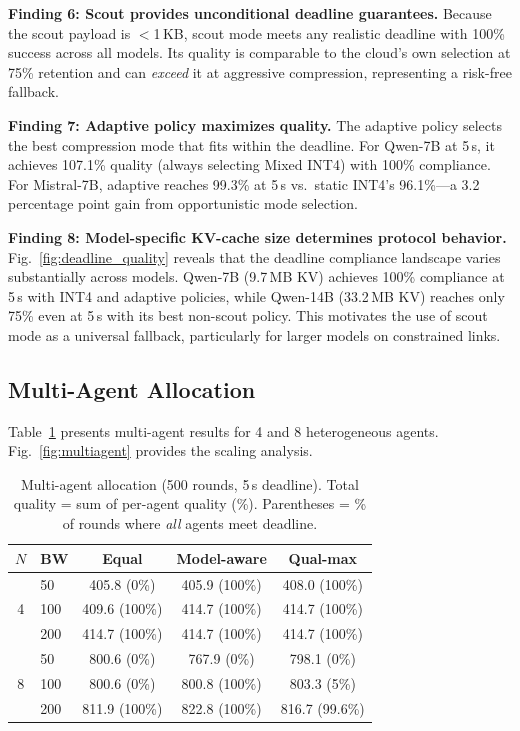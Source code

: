 \documentclass[conference]{IEEEtran}
\begin{document}
\textbf{Finding 6: Scout provides unconditional deadline guarantees.}
Because the scout payload is $<$1\,KB, scout mode meets any realistic deadline with 100\% success across all models.
Its quality is comparable to the cloud's own selection at 75\% retention and can \emph{exceed} it at aggressive compression, representing a risk-free fallback.

\textbf{Finding 7: Adaptive policy maximizes quality.}
The adaptive policy selects the best compression mode that fits within the deadline.
For Qwen-7B at 5\,s, it achieves 107.1\% quality (always selecting Mixed INT4) with 100\% compliance.
For Mistral-7B, adaptive reaches 99.3\% at 5\,s vs.\ static INT4's 96.1\%---a 3.2 percentage point gain from opportunistic mode selection.

\textbf{Finding 8: Model-specific KV-cache size determines protocol behavior.}
Fig.~\ref{fig:deadline_quality} reveals that the deadline compliance landscape varies substantially across models.
Qwen-7B (9.7\,MB KV) achieves 100\% compliance at 5\,s with INT4 and adaptive policies, while Qwen-14B (33.2\,MB KV) reaches only 75\% even at 5\,s with its best non-scout policy.
This motivates the use of scout mode as a universal fallback, particularly for larger models on constrained links.

\subsection{Multi-Agent Allocation}

Table~\ref{tab:multiagent} presents multi-agent results for 4 and 8 heterogeneous agents.
Fig.~\ref{fig:multiagent} provides the scaling analysis.

\begin{table}[t]
\centering
\caption{Multi-agent allocation (500 rounds, 5\,s deadline). Total quality = sum of per-agent quality (\%). Parentheses = \% of rounds where \emph{all} agents meet deadline.}
\label{tab:multiagent}
\small
\begin{tabular}{@{}clccc@{}}
\toprule
\textbf{$N$} & \textbf{BW} & \textbf{Equal} & \textbf{Model-aware} & \textbf{Qual-max} \\
\midrule
\multirow{3}{*}{4}
  & 50   & 405.8 (0\%)   & 405.9 (100\%) & 408.0 (100\%) \\
  & 100  & 409.6 (100\%) & 414.7 (100\%) & 414.7 (100\%) \\
  & 200  & 414.7 (100\%) & 414.7 (100\%) & 414.7 (100\%) \\
\midrule
\multirow{3}{*}{8}
  & 50   & 800.6 (0\%)   & 767.9 (0\%)   & 798.1 (0\%) \\
  & 100  & 800.6 (0\%)   & 800.8 (100\%) & 803.3 (5\%) \\
  & 200  & 811.9 (100\%) & 822.8 (100\%) & 816.7 (99.6\%) \\
\bottomrule
\end{tabular}
\end{table}
\end{document}
